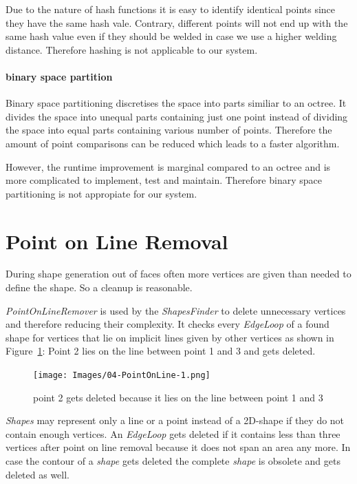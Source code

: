\documentclass[../ClassicThesis.tex]{subfiles}
\begin{document}
Due to the nature of hash functions it is easy to identify identical points since they have the same hash vale. Contrary, different points will not end up with the same hash value even if they should be welded in case we use a higher welding distance. Therefore hashing is not applicable to our system.

\paragraph{binary space partition}

Binary space partitioning discretises the space into parts similiar to an octree. It divides the space into unequal parts containing just one point instead of dividing the space into equal parts containing various number of points. Therefore the amount of point comparisons can be reduced which leads to a faster algorithm.

However, the runtime improvement is marginal compared to an octree and is more complicated to implement, test and maintain. Therefore binary space partitioning is not appropiate for our system.





\section{Point on Line Removal}

During shape generation out of faces often more vertices are given than needed to define the shape. So a cleanup is reasonable.

\emph{PointOnLineRemover} is used by the \emph{ShapesFinder} to delete unnecessary vertices and therefore reducing their complexity. It checks every \emph{EdgeLoop} of a found shape for vertices that lie on implicit lines given by other vertices as shown in Figure~\ref{fig:pointOnLine1}: Point 2 lies on the line between point 1 and 3 and gets deleted.

\begin{figure}
    \texttt{[image: Images/04-PointOnLine-1.png]}
    \caption{point 2 gets deleted because it lies on the line between point 1 and 3}
    \label{fig:pointOnLine1}
\end{figure}

\emph{Shapes} may represent only a line or a point instead of a 2D-shape if they do not contain enough vertices. An \emph{EdgeLoop} gets deleted if it contains less than three vertices after point on line removal because it does not span an area any more. In case the contour of a \emph{shape} gets deleted the complete \emph{shape} is obsolete and gets deleted as well.
\end{document}
